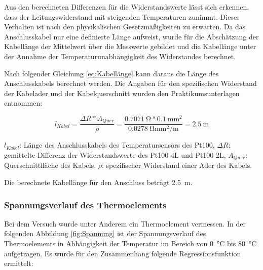 Aus den berechneten Differenzen für die Widerstandswerte lässt sich erkennen, dass der Leitungswiderstand mit steigenden Temperaturen zunimmt. Dieses Verhalten ist nach den physikalischen Gesetzmäßigkeiten zu erwarten. Da das Anschlusskabel nur eine definierte Länge aufweist, wurde für die Abschätzung der Kabellänge der Mittelwert über die Messwerte gebildet und die Kabellänge unter der Annahme der Temperaturunabhängigkeit des Widerstandes berechnet. 

Nach folgender Gleichung \ref{eq:Kabellänge} kann daraus die Länge des Anschlusskabels berechnet werden. Die Angaben für den spezifischen Widerstand der Kabelader und der Kabelquerschnitt wurden den Praktikumsunterlagen entnommen:

\begin{equation}
\label{eq:Kabellänge}
l_{Kabel}= \frac{\Delta R*A_{Quer}}{\rho}=\frac{\SI{0,7071}{\ohm}*\SI{0,1}{\milli\meter\squared}}{\SI{0,0278}{\ohm\milli\meter\squared\per\meter}}=\SI{2,5}{\meter}
\end{equation}

\begin{center}
	\begin{small}
		$l_{Kabel}$: Länge des Anschlusskabels des Temperatursensors des Pt100,
		$\Delta R$: gemittelte Differenz der Widerstandswerte des Pt100 4L und Pt100 2L,
		$A_{Quer}$: Querschnittfläche des Kabels,
		$\rho$: spezifischer Widerstand einer Ader des Kabels.
	\end{small}
\end{center}

Die berechnete Kabellänge für den Anschluss beträgt \SI{2,5}{\meter}.

\subsubsection{Spannungsverlauf des Thermoelements}

Bei dem Versuch wurde unter Anderem ein Thermoelement vermessen. In der folgenden Abbildung \ref{fig:Spannung} ist der Spannungsverlauf des Thermoelements in Abhängigkeit der Temperatur im Bereich von \SI{0}{\celsius} bis \SI{80}{\celsius} aufgetragen. Es wurde für den Zusammenhang folgende Regressionsfunktion ermittelt:
	

